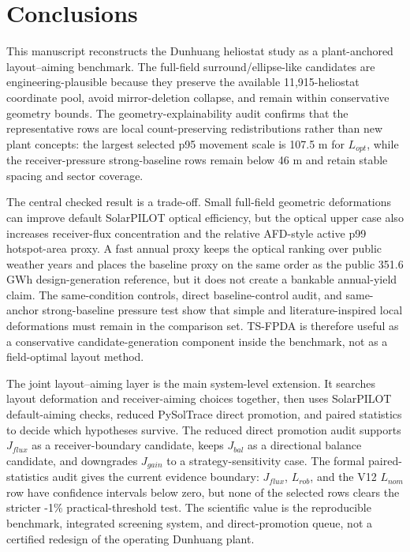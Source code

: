 \documentclass[final,3p,times]{elsarticle}
\begin{document}
\section{Conclusions}
This manuscript reconstructs the Dunhuang heliostat study as a plant-anchored layout--aiming benchmark. The full-field surround/ellipse-like candidates are engineering-plausible because they preserve the available 11,915-heliostat coordinate pool, avoid mirror-deletion collapse, and remain within conservative geometry bounds. The geometry-explainability audit confirms that the representative rows are local count-preserving redistributions rather than new plant concepts: the largest selected p95 movement scale is 107.5 m for $L_{opt}$, while the receiver-pressure strong-baseline rows remain below 46 m and retain stable spacing and sector coverage.

The central checked result is a trade-off. Small full-field geometric deformations can improve default SolarPILOT optical efficiency, but the optical upper case also increases receiver-flux concentration and the relative AFD-style active p99 hotspot-area proxy. A fast annual proxy keeps the optical ranking over public weather years and places the baseline proxy on the same order as the public 351.6 GWh design-generation reference, but it does not create a bankable annual-yield claim. The same-condition controls, direct baseline-control audit, and same-anchor strong-baseline pressure test show that simple and literature-inspired local deformations must remain in the comparison set. TS-FPDA is therefore useful as a conservative candidate-generation component inside the benchmark, not as a field-optimal layout method.

The joint layout--aiming layer is the main system-level extension. It searches layout deformation and receiver-aiming choices together, then uses SolarPILOT default-aiming checks, reduced PySolTrace direct promotion, and paired statistics to decide which hypotheses survive. The reduced direct promotion audit supports $J_{flux}$ as a receiver-boundary candidate, keeps $J_{bal}$ as a directional balance candidate, and downgrades $J_{gain}$ to a strategy-sensitivity case. The formal paired-statistics audit gives the current evidence boundary: $J_{flux}$, $L_{rob}$, and the V12 $L_{nom}$ row have confidence intervals below zero, but none of the selected rows clears the stricter -1\% practical-threshold test. The scientific value is the reproducible benchmark, integrated screening system, and direct-promotion queue, not a certified redesign of the operating Dunhuang plant.
\end{document}

